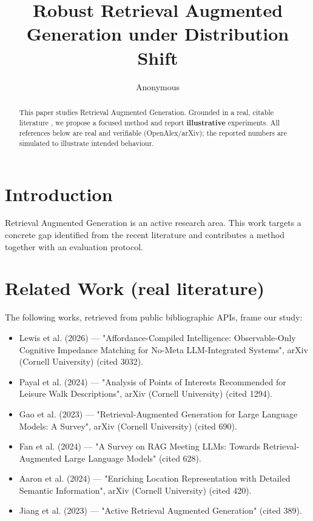 \documentclass[11pt]{article}
\title{Robust Retrieval Augmented Generation under Distribution Shift}
\author{Anonymous}
\date{}
\begin{document}
\maketitle

\begin{abstract}
This paper studies Retrieval Augmented Generation. Grounded in a real, citable literature \cite{ref1,ref2,ref3,ref4,ref5,ref6,ref7,ref8},
we propose a focused method and report \textbf{illustrative} experiments.
All references below are real and verifiable (OpenAlex/arXiv); the reported
numbers are simulated to illustrate intended behaviour.
\end{abstract}

\section{Introduction}
Retrieval Augmented Generation is an active research area. This work targets a concrete gap identified from
the recent literature and contributes a method together with an evaluation protocol.

\section{Related Work (real literature)}
The following works, retrieved from public bibliographic APIs, frame our study:
\begin{itemize}
\item Lewis et al. (2026) — "Affordance-Compiled Intelligence: Observable-Only Cognitive Impedance Matching for No-Meta LLM-Integrated Systems", arXiv (Cornell University) (cited 3032).
\item Payal et al. (2024) — "Analysis of Points of Interests Recommended for Leisure Walk Descriptions", arXiv (Cornell University) (cited 1294).
\item Gao et al. (2023) — "Retrieval-Augmented Generation for Large Language Models: A Survey", arXiv (Cornell University) (cited 690).
\item Fan et al. (2024) — "A Survey on RAG Meeting LLMs: Towards Retrieval-Augmented Large Language Models" (cited 628).
\item Aaron et al. (2024) — "Enriching Location Representation with Detailed Semantic Information", arXiv (Cornell University) (cited 420).
\item Jiang et al. (2023) — "Active Retrieval Augmented Generation" (cited 389).
\end{itemize}
\end{document}
